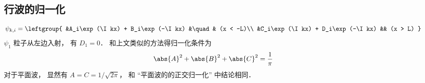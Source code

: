 \subsection{行波的归一化}

\begin{equation}
\psi_{k,i} = \leftgroup{
    &A_i\exp(\I kx) + B_i\exp(-\I kx) &\quad& (x < -L)\\
    &C_i\exp(\I kx) + D_i\exp(-\I kx) && (x > L)
}
\end{equation}
$\psi_1$ 粒子从左边入射， 有 $D_1 = 0$． 和上文类似的方法得归一化条件为
\begin{equation}
\abs{A}^2 + \abs{B}^2 + \abs{C}^2 = \frac{1}{\pi}
\end{equation}
对于平面波， 显然有 $A = C = 1/\sqrt{2\pi}$， 和 “平面波的的正交归一化” 中结论相同．
